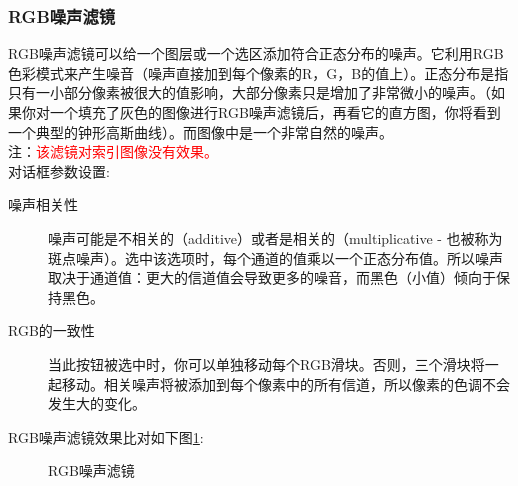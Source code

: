 \subsubsection{RGB噪声滤镜}\label{filters:noise:rgb}
RGB噪声滤镜可以给一个图层或一个选区添加符合正态分布的噪声。它利用RGB色彩模式来产生噪音（噪声直接加到每个像素的R，G，B的值上）。正态分布是指只有一小部分像素被很大的值影响，大部分像素只是增加了非常微小的噪声。（如果你对一个填充了灰色的图像进行RGB噪声滤镜后，再看它的直方图，你将看到一个典型的钟形高斯曲线）。而图像中是一个非常自然的噪声。\\
注：\textcolor{red}{该滤镜对索引图像没有效果。}\\
对话框参数设置:
\begin{description}
\item[噪声相关性]	噪声可能是不相关的（additive）或者是相关的（multiplicative - 也被称为斑点噪声）。选中该选项时，每个通道的值乘以一个正态分布值。所以噪声取决于通道值：更大的信道值会导致更多的噪音，而黑色（小值）倾向于保持黑色。
\item[RGB的一致性]	当此按钮被选中时，你可以单独移动每个RGB滑块。否则，三个滑块将一起移动。相关噪声将被添加到每个像素中的所有信道，所以像素的色调不会发生大的变化。
\end{description}
RGB噪声滤镜效果比对如下图\ref{filters:noise:rgb:figure}:
\begin{figure}[!htbp]
	\centering
	\caption{RGB噪声滤镜}
    	\label{filters:noise:rgb:figure}
\end{figure}
\clearpage


